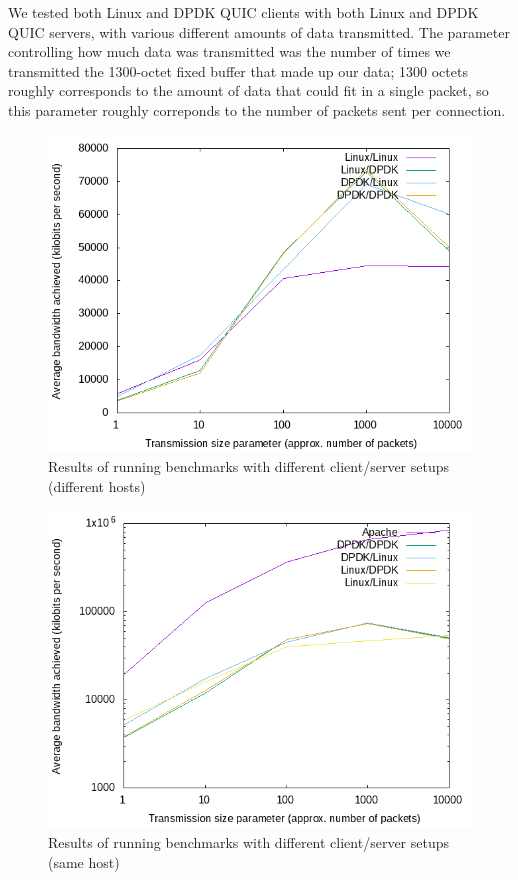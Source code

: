 \documentclass{sig-alternate-05-2015}
\begin{document}
We tested both Linux and DPDK QUIC clients with both Linux and DPDK QUIC servers,
with various different amounts of data transmitted.
The parameter controlling how much data was transmitted was the number of times we transmitted the 1300-octet fixed buffer that made up our data;
1300 octets roughly corresponds to the amount of data that could fit in a single packet,
so this parameter roughly correponds to the number of packets sent per connection.

\begin{figure}[bh]
\centering
\includegraphics[scale=0.5]{plot.png}
\caption{Results of running benchmarks with different client/server setups (different hosts)}
\label{fig:benchmark}
\end{figure}

\begin{figure}[bh]
\centering
\includegraphics[scale=0.5]{plot-adj.png}
\caption{Results of running benchmarks with different client/server setups (same host)}
\label{fig:benchmark-adj}
\end{figure}
\end{document}
